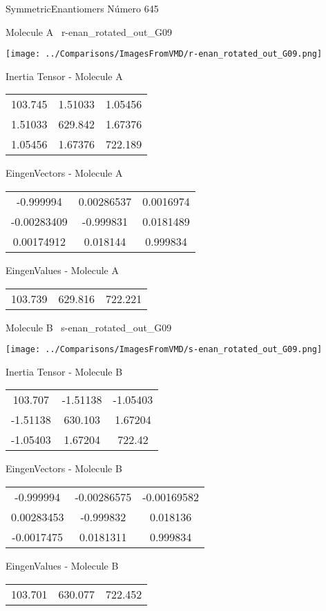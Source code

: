 \vtab[-3cm]
\begin{center}
{\large SymmetricEnantiomers \tab Número 645}
\end{center}
\begin{multicols}{2}
\begin{center}

Molecule A \
r-enan\_rotated\_out\_G09

\texttt{[image: ../Comparisons/ImagesFromVMD/r-enan\_rotated\_out\_G09.png]}

Inertia Tensor - Molecule A \\
\begin{tabular}{|c c c|}
103.745	 & 	1.51033	 & 	1.05456	 \\
1.51033	 & 	629.842	 & 	1.67376	 \\
1.05456	 & 	1.67376	 & 	722.189
\end{tabular}

\vtab
 EingenVectors - Molecule A     \\
\begin{tabular}{|c c c|}
-0.999994	 & 	0.00286537	 & 	0.0016974	 \\
-0.00283409	 & 	-0.999831	 & 	0.0181489	 \\
0.00174912	 & 	0.018144	 & 	0.999834
\end{tabular}

\vtab
 EingenValues - Molecule A     \\
\begin{tabular}{|c c c|}
103.739	 & 	629.816	 & 	722.221	 \\
\end{tabular}
\columnbreak

Molecule B \
s-enan\_rotated\_out\_G09

\texttt{[image: ../Comparisons/ImagesFromVMD/s-enan\_rotated\_out\_G09.png]}

Inertia Tensor - Molecule B \\
\begin{tabular}{|c c c|}
103.707	 & 	-1.51138	 & 	-1.05403	 \\
-1.51138	 & 	630.103	 & 	1.67204	 \\
-1.05403	 & 	1.67204	 & 	722.42
\end{tabular}

\vtab
 EingenVectors - Molecule B     \\
\begin{tabular}{|c c c|}
-0.999994	 & 	-0.00286575	 & 	-0.00169582	 \\
0.00283453	 & 	-0.999832	 & 	0.018136	 \\
-0.0017475	 & 	0.0181311	 & 	0.999834
\end{tabular}

\vtab
 EingenValues - Molecule B     \\
\begin{tabular}{|c c c|}
103.701	 & 	630.077	 & 	722.452	 \\
\end{tabular}

\end{center}
\end{multicols}

